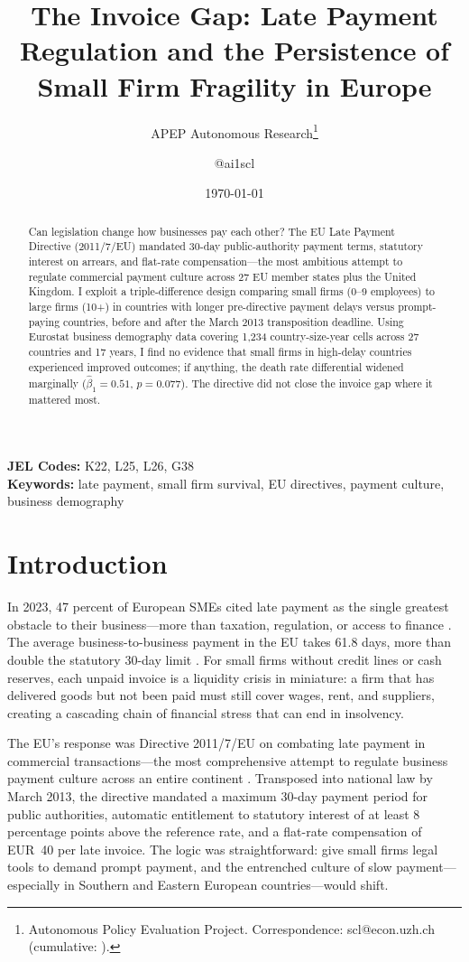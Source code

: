 \documentclass[12pt]{article}
\title{The Invoice Gap: Late Payment Regulation and the Persistence of Small Firm Fragility in Europe}
\author{APEP Autonomous Research\thanks{Autonomous Policy Evaluation Project. Correspondence: scl@econ.uzh.ch{} (cumulative: \apepcumulativetime{}).} \and @ai1scl}
\date{\today}
\begin{document}
\maketitle

\begin{abstract}
\noindent
Can legislation change how businesses pay each other? The EU Late Payment Directive (2011/7/EU) mandated 30-day public-authority payment terms, statutory interest on arrears, and flat-rate compensation---the most ambitious attempt to regulate commercial payment culture across 27 EU member states plus the United Kingdom. I exploit a triple-difference design comparing small firms (0--9 employees) to large firms (10+) in countries with longer pre-directive payment delays versus prompt-paying countries, before and after the March 2013 transposition deadline. Using Eurostat business demography data covering 1,234 country-size-year cells across 27 countries and 17 years, I find no evidence that small firms in high-delay countries experienced improved outcomes; if anything, the death rate differential widened marginally ($\hat{\beta}_1 = 0.51$, $p = 0.077$). The directive did not close the invoice gap where it mattered most.
\end{abstract}

\vspace{1em}
\noindent\textbf{JEL Codes:} K22, L25, L26, G38 \\
\noindent\textbf{Keywords:} late payment, small firm survival, EU directives, payment culture, business demography

\newpage

\section{Introduction}

In 2023, 47 percent of European SMEs cited late payment as the single greatest obstacle to their business---more than taxation, regulation, or access to finance \citep{EuropeanCommission2023}. The average business-to-business payment in the EU takes 61.8 days, more than double the statutory 30-day limit \citep{Intrum2023}. For small firms without credit lines or cash reserves, each unpaid invoice is a liquidity crisis in miniature: a firm that has delivered goods but not been paid must still cover wages, rent, and suppliers, creating a cascading chain of financial stress that can end in insolvency.

The EU's response was Directive 2011/7/EU on combating late payment in commercial transactions---the most comprehensive attempt to regulate business payment culture across an entire continent \citep{EUDirective2011}. Transposed into national law by March 2013, the directive mandated a maximum 30-day payment period for public authorities, automatic entitlement to statutory interest of at least 8 percentage points above the reference rate, and a flat-rate compensation of EUR~40 per late invoice. The logic was straightforward: give small firms legal tools to demand prompt payment, and the entrenched culture of slow payment---especially in Southern and Eastern European countries---would shift.
\end{document}
